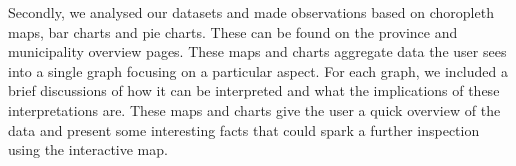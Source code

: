 \documentclass[a4paper,11pt]{article}
\begin{document}
Secondly, we analysed our datasets and made observations based on choropleth maps, bar charts and pie charts. These can be found on the province and municipality overview pages. These maps and charts aggregate data the user sees into a single graph focusing on a particular aspect. For each graph, we included a brief discussions of how it can be interpreted and what the implications of these interpretations are. These maps and charts give the user a quick overview of the data and present some interesting facts that could spark a further inspection using the interactive map.
\end{document}
